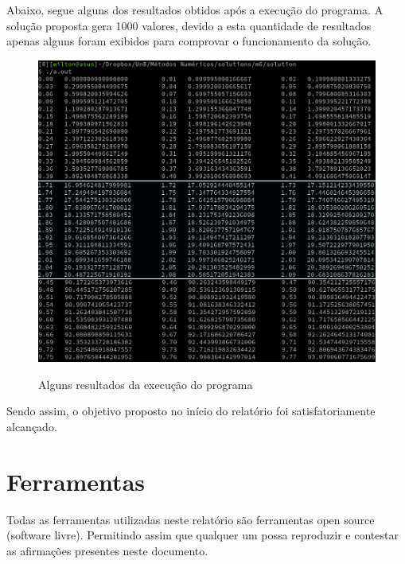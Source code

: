 \documentclass[12pt, hidelinks]{article}
\begin{document}
Abaixo, segue alguns dos resultados obtidos após a execução do programa. A solução proposta gera 1000 valores, devido a esta quantidade de resultados apenas alguns foram exibidos para comprovar o funcionamento da solução.
\begin{figure}[!h]
  \centering
  \includegraphics[width=15cm]{figuras/result.png}\\
  \caption{Alguns resultados da execução do programa}\label{fig:result}
\end{figure}

Sendo assim, o objetivo proposto no início do relatório foi satisfatoriamente alcançado.

\newpage
\section{Ferramentas}
Todas as ferramentas utilizadas neste relatório são ferramentas open source (software livre).
Permitindo assim que qualquer um possa reproduzir e contestar as afirmações presentes neste documento.
\end{document}
